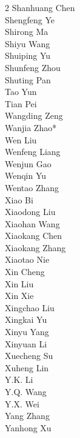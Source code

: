 \documentclass[11pt, a4paper, logo, copyright, nonumbering]{deepseek}
\begin{document}
\begin{multicols}{2}
\color{damaiblue} Shanhuang Chen \\
\color{damaiblue} Shengfeng Ye \\
\color{damaiblue} Shirong Ma \\
\color{damaiblue} Shiyu Wang \\
\color{damaiblue} Shuiping Yu \\
\color{damaiblue} Shunfeng Zhou \\
\color{damaiblue} Shuting Pan \\
\color{damaiblue} Tao Yun \\
\color{damaiblue} Tian Pei \\
\color{damaiblue} Wangding Zeng \\
\color{damaiblue} Wanjia Zhao* \\
\color{damaiblue} Wen Liu \\
\color{damaiblue} Wenfeng Liang \\
\color{damaiblue} Wenjun Gao \\
\color{damaiblue} Wenqin Yu \\
\color{damaiblue} Wentao Zhang \\
\color{damaiblue} Xiao Bi \\
\color{damaiblue} Xiaodong Liu \\
\color{damaiblue} Xiaohan Wang \\
\color{damaiblue} Xiaokang Chen \\
\color{damaiblue} Xiaokang Zhang \\
\color{damaiblue} Xiaotao Nie \\
\color{damaiblue} Xin Cheng \\
\color{damaiblue} Xin Liu \\
\color{damaiblue} Xin Xie \\
\color{damaiblue} Xingchao Liu \\
\color{damaiblue} Xingkai Yu \\
\color{damaiblue} Xinyu Yang \\
\color{damaiblue} Xinyuan Li \\
\color{damaiblue} Xuecheng Su \\
\color{damaiblue} Xuheng Lin \\
\color{damaiblue} Y.K. Li \\
\color{damaiblue} Y.Q. Wang \\
\color{damaiblue} Y.X. Wei \\
\color{damaiblue} Yang Zhang \\
\color{damaiblue} Yanhong Xu \\

\end{multicols}
\end{document}
